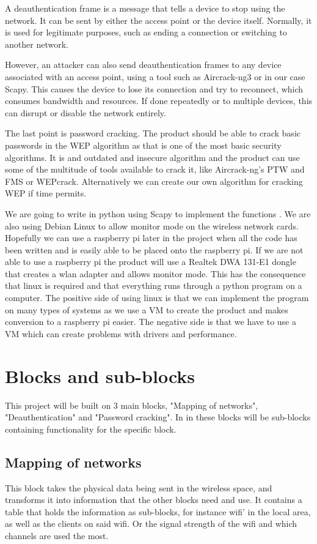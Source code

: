 A deauthentication frame is a message that tells a device to stop using the network. It can be sent by either the access point or the device itself. Normally, it is used for legitimate purposes, such as ending a connection or switching to another network.

However, an attacker can also send deauthentication frames to any device associated with an access point, using a tool such as Aircrack-ng3 or in our case Scapy. This causes the device to lose its connection and try to reconnect, which consumes bandwidth and resources. If done repeatedly or to multiple devices, this can disrupt or disable the network entirely.

The last point is password cracking. The product should be able to crack basic passwords in the WEP algorithm as that is one of the most basic security algorithms. It is and outdated and insecure algorithm and the product can use some of the multitude of tools available to crack it, like Aircrack-ng's PTW and FMS or WEPcrack. Alternatively we can create our own algorithm for cracking WEP if time permits.

We are going to write in python using Scapy to implement the functions \cite{scapy}. We are also using Debian Linux to allow monitor mode on the wireless network cards. Hopefully we can use a raspberry pi later in the project when all the code has been written and is easily able to be placed onto the raspberry pi. 
If we are not able to use a raspberry pi the product will use a Realtek DWA 131-E1 dongle that creates a wlan adapter and allows monitor mode. This has the consequence that linux is required and that everything runs through a python program on a computer.
The positive side of using linux is that we can implement the program on many types of systems as we use a VM to create the product and makes conversion to a raspberry pi easier. The negative side is that we have to use a VM which can create problems with drivers and performance. 

\section{Blocks and sub-blocks}

This project will be built on 3 main blocks, "Mapping of networks", "Deauthentication" and "Password cracking". In in these blocks will be sub-blocks containing functionality for the specific block. 

\subsection{Mapping of networks}
This block takes the physical data being sent in the wireless space, and transforms it into information that the other blocks need and use. It contains a table that holds the information as sub-blocks, for instance wifi' in the local area, as well as the clients on said wifi. Or the signal strength of the wifi and which channels are used the most.

